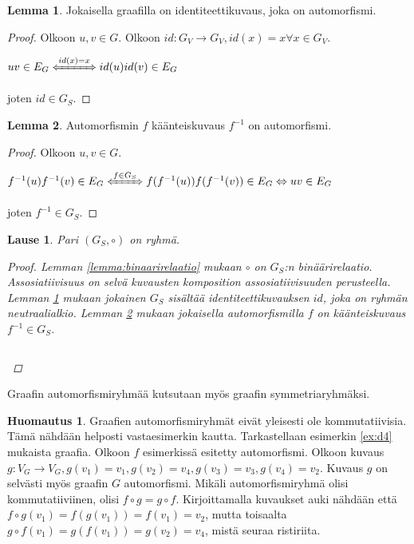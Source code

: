 \documentclass[a4paper, 12pt]{article}
\theoremstyle{definition}
\newtheorem{huom}{Huomautus}
\newtheorem{lemma}{Lemma}
\theoremstyle{plain}
\newtheorem{teor}[mydef]{Lause}
\begin{document}
\begin{lemma}
\label{lemma:identiteetti}
Jokaisella graafilla on identiteettikuvaus, joka on automorfismi.
\begin{proof}
Olkoon $u, v \in G$. Olkoon $id: G_V \rightarrow G_V, id(x) = x \forall x \in G_V$.
\begin{center}
\begin{math}
uv \in E_G \xLeftrightarrow{id(x) = x} id(u)id(v) \in E_G  
\end{math}
\end{center}
joten $id \in G_S$.
\end{proof}
\end{lemma}

\begin{lemma}
\label{lemma:kaanteiskuvaus}
Automorfismin $f$ käänteiskuvaus $f^{-1}$ on automorfismi.
\begin{proof}
Olkoon $u, v \in G$.
\begin{center}
\begin{math}
f^{-1}(u)f^{-1}(v) \in E_G \xLeftrightarrow{f \in G_S} f(f^{-1}(u))f(f^{-1}(v)) \in E_G \Leftrightarrow uv \in E_G
\end{math}
\end{center}
joten $f^{-1} \in G_S$.
\end{proof}
\end{lemma}

\begin{teor}
Pari $(G_S, \circ)$ on ryhmä.
\begin{proof}
Lemman \ref{lemma:binaarirelaatio} mukaan $\circ$ on $G_S$:n binäärirelaatio. Assosiatiivisuus on selvä kuvausten komposition assosiatiivisuuden perusteella. Lemman \ref{lemma:identiteetti} mukaan jokainen $G_S$ sisältää identiteettikuvauksen $id$, joka on ryhmän neutraalialkio. Lemman \ref{lemma:kaanteiskuvaus} mukaan jokaisella automorfismilla $f$ on käänteiskuvaus $f^{-1} \in G_S$.
\begin{center}
\begin{math}
\end{math}
\end{center}
\end{proof}
\end{teor}

Graafin automorfismiryhmää kutsutaan myös graafin symmetriaryhmäksi.

\begin{huom}
Graafien automorfismiryhmät eivät yleisesti ole kommutatiivisia.\\
Tämä nähdään helposti vastaesimerkin kautta. Tarkastellaan esimerkin \ref{ex:d4} mukaista graafia. Olkoon $f$ esimerkissä esitetty automorfismi. Olkoon kuvaus $g: V_G \rightarrow V_G, g(v_1) = v_1, g(v_2) = v_4, g(v_3) = v_3, g(v_4) = v_2$. Kuvaus $g$ on selvästi myös graafin $G$ automorfismi. Mikäli automorfismiryhmä olisi kommutatiiviinen, olisi $f \circ g = g \circ f$. Kirjoittamalla kuvaukset auki nähdään että $f \circ g(v_1) = f(g(v_1)) = f(v_1) = v_2$, mutta toisaalta $g \circ f (v_1) = g(f(v_1)) = g(v_2) = v_4$, mistä seuraa ristiriita.
\end{huom}
\end{document}
